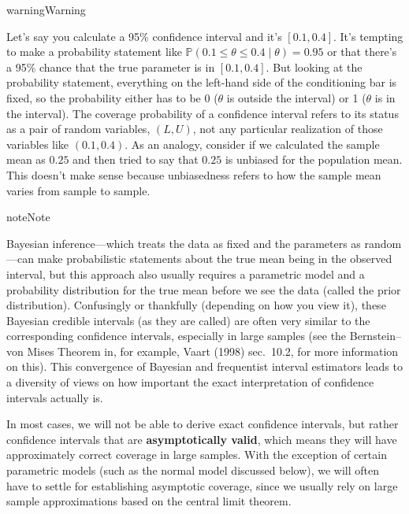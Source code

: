 \documentclass[
  13pt,
  letterpaper,
  DIV=11,
  numbers=noendperiod]{scrreprt}
\renewcommand{\P}{\mathbb{P}}
\theoremstyle{plain}
\theoremstyle{plain}
\theoremstyle{definition}
\theoremstyle{definition}
\theoremstyle{remark}
\begin{document}
\begin{bookcallout}{warning}{Warning}

Let's say you calculate a 95\% confidence interval and it's
\([0.1, 0.4]\). It's tempting to make a probability statement like
\(\P(0.1 \leq \theta \leq 0.4 \mid \theta) = 0.95\) or that there's a
95\% chance that the true parameter is in \([0.1, 0.4]\). But looking at
the probability statement, everything on the left-hand side of the
conditioning bar is fixed, so the probability either has to be 0
(\(\theta\) is outside the interval) or 1 (\(\theta\) is in the
interval). The coverage probability of a confidence interval refers to
its status as a pair of random variables, \((L, U)\), not any particular
realization of those variables like \((0.1, 0.4)\). As an analogy,
consider if we calculated the sample mean as \(0.25\) and then tried to
say that \(0.25\) is unbiased for the population mean. This doesn't make
sense because unbiasedness refers to how the sample mean varies from
sample to sample.

\end{bookcallout}

\begin{bookcallout}{note}{Note}

Bayesian inference---which treats the data as fixed and the parameters
as random---can make probabilistic statements about the true mean being
in the observed interval, but this approach also usually requires a
parametric model and a probability distribution for the true mean before
we see the data (called the prior distribution). Confusingly or
thankfully (depending on how you view it), these Bayesian credible
intervals (as they are called) are often very similar to the
corresponding confidence intervals, especially in large samples (see the
Bernstein--von Mises Theorem in, for example, Vaart (1998) sec.~10.2,
for more information on this). This convergence of Bayesian and
frequentist interval estimators leads to a diversity of views on how
important the exact interpretation of confidence intervals actually is.

\end{bookcallout}

In most cases, we will not be able to derive exact confidence intervals,
but rather confidence intervals that are \textbf{asymptotically valid},
which means they will have approximately correct coverage in large
samples. With the exception of certain parametric models (such as the
normal model discussed below), we will often have to settle for
establishing asymptotic coverage, since we usually rely on large sample
approximations based on the central limit theorem.
\end{document}
